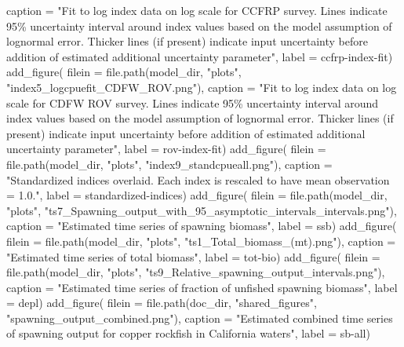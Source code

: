 \documentclass[
  letterpaper,
]{article}
\newenvironment{Shaded}{\begin{snugshade}}{\end{snugshade}}
\newcommand{\AttributeTok}[1]{\textcolor[rgb]{0.77,0.63,0.00}{#1}}
\newcommand{\FunctionTok}[1]{\textcolor[rgb]{0.00,0.00,0.00}{#1}}
\newcommand{\NormalTok}[1]{#1}
\newcommand{\StringTok}[1]{\textcolor[rgb]{0.31,0.60,0.02}{#1}}
\begin{document}
\begin{Shaded}
\begin{Highlighting}[]
\AttributeTok{caption =} \StringTok{"Fit to log index data on log scale for CCFRP survey. Lines indicate 95\% uncertainty interval around index values based on the model assumption of lognormal error. Thicker lines (if present) indicate input uncertainty before addition of estimated additional uncertainty parameter"}\NormalTok{,}
\AttributeTok{label =} \StringTok{\textquotesingle{}ccfrp{-}index{-}fit\textquotesingle{}}\NormalTok{)}
\FunctionTok{add\_figure}\NormalTok{(}
\AttributeTok{filein =} \FunctionTok{file.path}\NormalTok{(model\_dir, }\StringTok{"plots"}\NormalTok{, }\StringTok{"index5\_logcpuefit\_CDFW\_ROV.png"}\NormalTok{), }
\AttributeTok{caption =} \StringTok{"Fit to log index data on log scale for CDFW ROV survey. Lines indicate 95\% uncertainty interval around index values based on the model assumption of lognormal error. Thicker lines (if present) indicate input uncertainty before addition of estimated additional uncertainty parameter"}\NormalTok{,}
\AttributeTok{label =} \StringTok{\textquotesingle{}rov{-}index{-}fit\textquotesingle{}}\NormalTok{)}
\FunctionTok{add\_figure}\NormalTok{(}
\AttributeTok{filein =} \FunctionTok{file.path}\NormalTok{(model\_dir, }\StringTok{"plots"}\NormalTok{, }\StringTok{"index9\_standcpueall.png"}\NormalTok{), }
\AttributeTok{caption =} \StringTok{"Standardized indices overlaid. Each index is rescaled to have mean observation = 1.0."}\NormalTok{,}
\AttributeTok{label =} \StringTok{\textquotesingle{}standardized{-}indices\textquotesingle{}}\NormalTok{)}
\FunctionTok{add\_figure}\NormalTok{(}
\AttributeTok{filein =} \FunctionTok{file.path}\NormalTok{(model\_dir, }\StringTok{"plots"}\NormalTok{, }\StringTok{"ts7\_Spawning\_output\_with\_95\_asymptotic\_intervals\_intervals.png"}\NormalTok{), }
\AttributeTok{caption =} \StringTok{"Estimated time series of spawning biomass"}\NormalTok{,}
\AttributeTok{label =} \StringTok{\textquotesingle{}ssb\textquotesingle{}}\NormalTok{)}
\FunctionTok{add\_figure}\NormalTok{(}
\AttributeTok{filein =} \FunctionTok{file.path}\NormalTok{(model\_dir, }\StringTok{"plots"}\NormalTok{, }\StringTok{"ts1\_Total\_biomass\_(mt).png"}\NormalTok{), }
\AttributeTok{caption =} \StringTok{"Estimated time series of total biomass"}\NormalTok{,}
\AttributeTok{label =} \StringTok{\textquotesingle{}tot{-}bio\textquotesingle{}}\NormalTok{)}
\FunctionTok{add\_figure}\NormalTok{(}
\AttributeTok{filein =} \FunctionTok{file.path}\NormalTok{(model\_dir, }\StringTok{"plots"}\NormalTok{, }\StringTok{"ts9\_Relative\_spawning\_output\_intervals.png"}\NormalTok{), }
\AttributeTok{caption =} \StringTok{"Estimated time series of fraction of unfished spawning biomass"}\NormalTok{,}
\AttributeTok{label =} \StringTok{\textquotesingle{}depl\textquotesingle{}}\NormalTok{)}
\FunctionTok{add\_figure}\NormalTok{(}
\AttributeTok{filein =} \FunctionTok{file.path}\NormalTok{(doc\_dir, }\StringTok{"shared\_figures"}\NormalTok{, }\StringTok{"spawning\_output\_combined.png"}\NormalTok{), }
\AttributeTok{caption =} \StringTok{"Estimated combined time series of spawning output for copper rockfish in California waters"}\NormalTok{,}
\AttributeTok{label =} \StringTok{\textquotesingle{}sb{-}all\textquotesingle{}}\NormalTok{)}


\end{Highlighting}
\end{Shaded}
\end{document}
